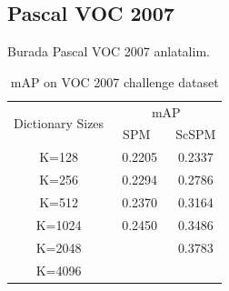 \documentclass[conference]{IEEEtran}
\begin{document}
\subsection{Pascal VOC 2007}

Burada Pascal VOC 2007 anlatalim.

\begin{table}[ph]
  \centering
  \begin{tabular}{|c|c|c|}
    \hline
    \multirow{2}{*}{Dictionary Sizes} & \multicolumn{2}{c|}{mAP} \\
    \cline{2-3}
    & \ SPM\ \ & ScSPM \\
    \hline
     K=128 & 0.2205 & 0.2337 \\
    \hline
     K=256 & 0.2294 & 0.2786 \\
     \hline
     K=512 & 0.2370 & 0.3164 \\
     \hline
     K=1024 & 0.2450 & 0.3486 \\
     \hline
     K=2048 & & 0.3783 \\
     \hline
     K=4096 & & \\
    \hline
  \end{tabular}
  \caption{ mAP on VOC 2007 challenge dataset }
  \label{tablo}
\end{table}
\end{document}
